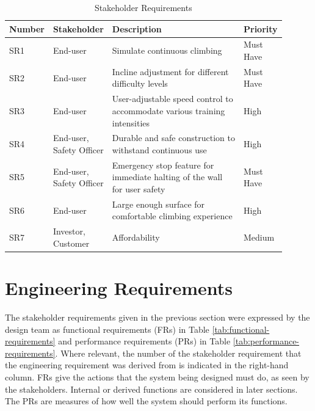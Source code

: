 \begin{table}[H]
\centering
\caption{Stakeholder Requirements}
\label{tab:stakeholder-requirements}
\begin{tabular}{|>{\centering\arraybackslash}p{0.1\linewidth}|>{\raggedright\arraybackslash}p{0.15\linewidth}|>{\raggedright\arraybackslash}p{0.55\linewidth}|>{\centering\arraybackslash}p{0.1\linewidth}|}
\hline
\textbf{Number}  & \textbf{Stakeholder} & \textbf{Description} & \textbf{Priority} \\
\hline
SR1  & End-user & Simulate continuous climbing & Must Have \\
SR2  & End-user & Incline adjustment for different difficulty levels & Must Have \\
SR3  & End-user & User-adjustable speed control to accommodate various training intensities & High \\
SR4  & End-user, Safety Officer & Durable and safe construction to withstand continuous use & High \\
SR5  & End-user, Safety Officer & Emergency stop feature for immediate halting of the wall for user safety & Must Have \\
SR6  & End-user & Large enough surface for comfortable climbing experience & High \\
SR7 & Investor, Customer & Affordability & Medium \\
\hline
\end{tabular}
\end{table}

\section{Engineering Requirements}

The stakeholder requirements given in the previous section were expressed by the design team as functional requirements (FRs) in Table \ref{tab:functional-requirements} and performance requirements (PRs) in Table \ref{tab:performance-requirements}. Where relevant, the number of the stakeholder requirement that the engineering requirement was derived from is indicated in the right-hand column. FRs give the actions that the system being designed must do, as seen by the stakeholders. Internal or derived functions are considered in later sections. The PRs are measures of how well the system should perform its functions.

